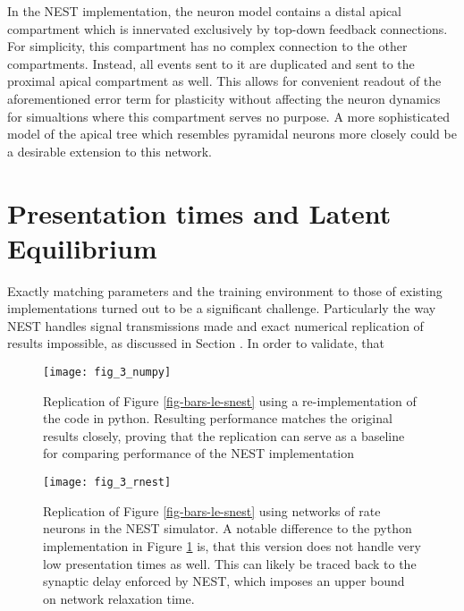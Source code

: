 In the NEST implementation, the neuron model contains a distal apical compartment which is innervated exclusively by top-down
feedback connections. For simplicity, this compartment has no complex connection to the other compartments. Instead,
all events sent to it are duplicated and sent to the proximal apical compartment as well. This allows for convenient 
readout of the aforementioned error term for plasticity without affecting the neuron dynamics for simualtions where 
this compartment serves no purpose. A more sophisticated model of the apical tree which resembles pyramidal neurons more
closely could be a desirable extension to this network.

\section{Presentation times and Latent Equilibrium}\label{sec-appendix-t-pres}

Exactly matching parameters and the training environment to those of existing implementations turned out to be a
significant challenge. Particularly the way NEST handles signal transmissions made and exact numerical replication of
results impossible, as discussed in Section . In order to validate, that



\begin{figure}[t]
    \centering
    \texttt{[image: fig\_3\_numpy]}
    \caption{Replication of Figure \ref{fig-bars-le-snest} using a re-implementation of the \cite{Haider2021} code in
        python. Resulting performance matches the original results closely, proving that the replication can serve as a
        baseline for comparing performance of the NEST implementation}
    \label{fig-bars-le-numpy}
\end{figure}


\begin{figure}[t]
    \centering
    \texttt{[image: fig\_3\_rnest]}
    \caption{Replication of Figure \ref{fig-bars-le-snest} using networks of rate neurons in the NEST simulator. A
    notable difference to the python implementation in Figure \ref{fig-bars-le-numpy} is, that this version does not
    handle very low presentation times as well. This can likely be traced back to the synaptic delay enforced by NEST,
    which imposes an upper bound on network relaxation time.}
    \label{fig-bars-le-rnest}
\end{figure}


